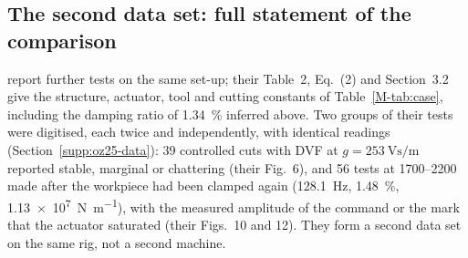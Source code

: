 
\subsection{The second data set: full statement of the comparison}\label{supp:std-model-second}

\citet{ozsoy2025frequency} report further tests on the same set-up; their Table~2, Eq.~(2) and Section~3.2 give the structure, actuator, tool and cutting constants of Table~\ref{M-tab:case}, including the damping ratio of \SI{1.34}{\percent} inferred above. Two groups of their tests were digitised, each twice and independently, with identical readings (Section~\ref{supp:oz25-data}): 39 controlled cuts with DVF at $g=\SI{253}{\volt\second\per\metre}$ reported stable, marginal or chattering (their Fig.~6), and 56 tests at 1700--\SI{2200}{\rpm} made after the workpiece had been clamped again (\SI{128.1}{\hertz}, \SI{1.48}{\percent}, \SI{1.13e7}{\newton\per\metre}), with the measured amplitude of the command or the mark that the actuator saturated (their Figs.~10 and 12). They form a second data set on the same rig, not a second machine.


